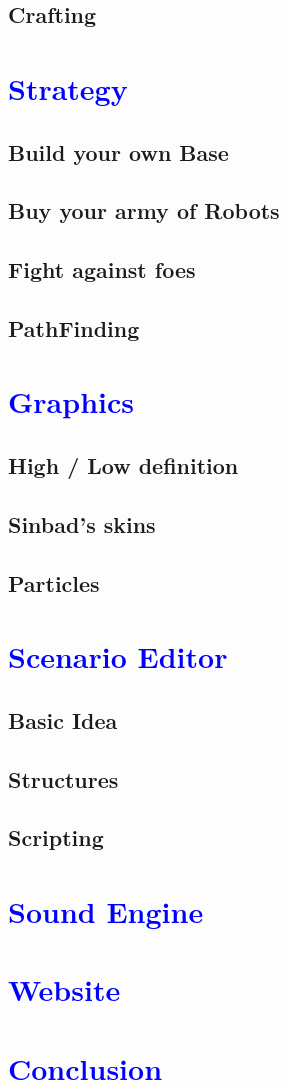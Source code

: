 \documentclass[article]{report}         %
\begin{document}
      \section{Crafting}
    \chapter{\textcolor{blue}{Strategy}}
      \section{Build your own Base}
      \section{Buy your army of Robots}
      \section{Fight against foes}
      \section{PathFinding}
    \chapter{\textcolor{blue}{Graphics}}
      \section{High / Low definition}
      \section{Sinbad's skins}
      \section{Particles}
    \chapter{\textcolor{blue}{Scenario Editor}}
      \section{Basic Idea}
      \section{Structures}
      \section{Scripting}
    \chapter{\textcolor{blue}{Sound Engine}}
    \chapter{\textcolor{blue}{Website}}
    \chapter{\textcolor{blue}{Conclusion}}
    
\end{document}
